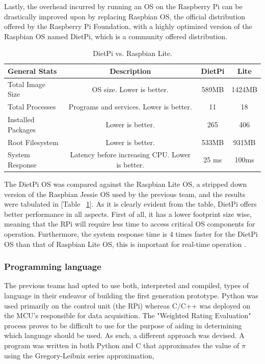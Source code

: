 Lastly, the overhead incurred by running an OS on the Raspberry Pi can be drastically improved upon by replacing Raspbian OS, the official distribution offered by the Raspberry Pi Foundation, with a highly optimized version of the Raspbian OS named DietPi, which is a community offered distribution.

\begin{table}[H]
\caption{\label{tab:Diet_vs_Lite}DietPi vs. Raspbian Lite.}
\centering
\begin{tabular}{l|c|c|c}
\hline\hline
General Stats  & Description	& DietPi	& Lite 	\\
\hline
Total Image Size  	& OS size. Lower is better.  			& 589MB & 1424MB 	\\\hline
Total Processes 	& Programs and services. Lower is better. 	& 11 	& 18 	\\\hline
Installed Packages  & Lower is better. 							& 265   & 406 	\\\hline
Root Filesystem    	& Lower is better. 						& 533MB & 931MB		\\\hline
System Response    	& Latency before increasing CPU. Lower is better. 	& 25 ms & 100ms \\\hline
\end{tabular}
\end{table}

The DietPi OS was compared against the Raspbian Lite OS, a stripped down version of the Raspbian Jessie OS used by the previous team, and the results were tabulated in [Table ~\ref{tab:Diet_vs_Lite}]. As it is clearly evident from the table, DietPi offers better performance in all aspects. First of all, it has a lower footprint size wise, meaning that the RPi will require less time to access critical OS components for operation. Furthermore, the system response time is 4 times faster for the DietPi OS than that of Raspbian Lite OS, this is important for real-time operation \cite{DietPi_Site}.


\subsubsection{Programming language}

\indent\indent The previous teams had opted to use both, interpreted and compiled, types of language in their endeavor of building the first generation prototype. Python was used primarily on the control unit (the RPi) whereas C/C++ was deployed on the MCU's responsible for data acquisition. The "Weighted Rating Evaluation" process proves to be difficult to use for the purpose of aiding in determining which language should be used. As such, a different approach was devised. A program was written in both Python and C that approximates the value of $\pi$ using the Gregory-Leibniz series approximation,

